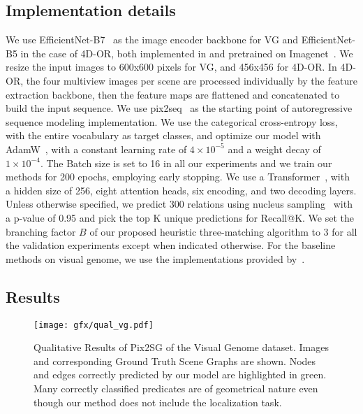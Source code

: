 \documentclass[10pt,twocolumn,letterpaper]{article}
\begin{document}
\subsection{Implementation details}
We use EfficientNet-B7~\cite{tan_efficientnet_2020} as the image encoder backbone for VG and EfficientNet-B5 in the case of 4D-OR, both implemented in \cite{wightman_pytorch_2019} and pretrained on Imagenet~\cite{russakovsky_imagenet_2015}. We resize the input images to 600x600 pixels for VG, and 456x456 for 4D-OR. In 4D-OR, the four multiview images per scene are processed individually by the feature extraction backbone, then the feature maps are flattened and concatenated to build the input sequence. We use pix2seq~\cite{chen_pix2seq_2022} as the starting point of autoregressive sequence modeling implementation.
We use the categorical cross-entropy loss, with the entire vocabulary as target classes, and optimize our model with AdamW~\cite{loshchilov_decoupled_2019}, with a constant learning rate of $4 \times 10^{-5}$ and a weight decay of $1 \times 10^{-4}$. The Batch size is set to 16 in all our experiments and we train our methods for 200 epochs, employing early stopping. We use a Transformer~\cite{vaswani_attention_2017}, with a hidden size of 256, eight attention heads, six encoding, and two decoding layers. Unless otherwise specified, we predict 300 relations using nucleus sampling~\cite{holtzman_curious_2020} with a p-value of 0.95 and pick the top K unique predictions for Recall@K. We set the branching factor $B$ of our proposed heuristic three-matching algorithm to 3 for all the validation experiments except when indicated otherwise. For the baseline methods on  visual genome, we use the implementations provided by~\cite{tang_scene_2020}. 



\subsection{Results}
\label{sec:results}
\begin{figure*}[t]
  \centering
   \texttt{[image: gfx/qual\_vg.pdf]}
   \caption{Qualitative Results of Pix2SG of the Visual Genome dataset. Images and corresponding Ground Truth Scene Graphs are shown. Nodes and edges correctly predicted by our model are highlighted in green. Many correctly classified predicates are of geometrical nature even though our method does not include the localization task.}
   \label{fig:qual_vg}
\end{figure*}
\end{document}
